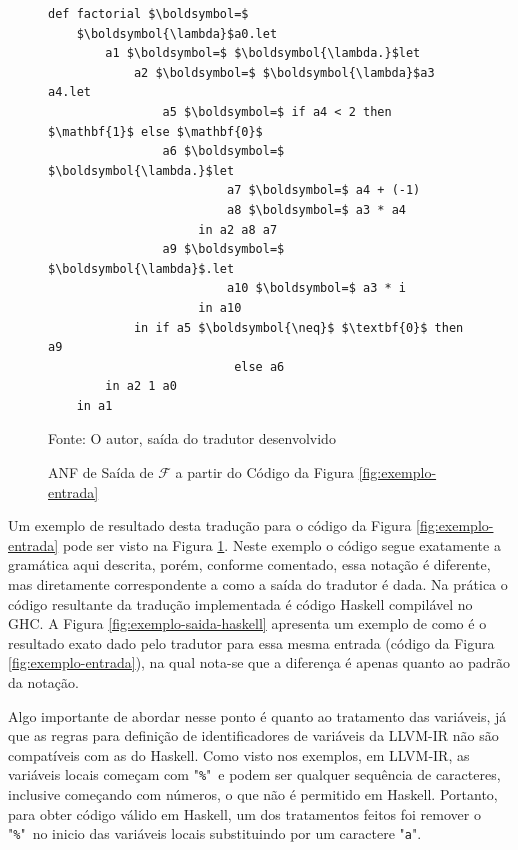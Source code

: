 \begin{figure}[h]
\begin{center}
\renewcommand{\ttdefault}{pcr}
\begin{lstlisting}[mathescape]
def factorial $\boldsymbol=$
    $\boldsymbol{\lambda}$a0.let
        a1 $\boldsymbol=$ $\boldsymbol{\lambda.}$let
            a2 $\boldsymbol=$ $\boldsymbol{\lambda}$a3 a4.let
                a5 $\boldsymbol=$ if a4 < 2 then $\mathbf{1}$ else $\mathbf{0}$
                a6 $\boldsymbol=$ $\boldsymbol{\lambda.}$let
                         a7 $\boldsymbol=$ a4 + (-1)
                         a8 $\boldsymbol=$ a3 * a4
                     in a2 a8 a7
                a9 $\boldsymbol=$ $\boldsymbol{\lambda}$.let
                         a10 $\boldsymbol=$ a3 * i
                     in a10
            in if a5 $\boldsymbol{\neq}$ $\textbf{0}$ then a9
                          else a6
        in a2 1 a0
    in a1
\end{lstlisting}
\caption{ANF de Saída de $\mathcal{F}$ a partir do Código da Figura \ref{fig:exemplo-entrada}}
\label{fig:exemplo-saida}
\small{Fonte: O autor, saída do tradutor desenvolvido}
\end{center}
\end{figure}

Um exemplo de resultado desta tradução para o código da Figura \ref{fig:exemplo-entrada} pode ser visto na Figura \ref{fig:exemplo-saida}. Neste exemplo o código segue exatamente a gramática aqui descrita, porém, conforme comentado, essa notação é diferente, mas diretamente correspondente a como a saída do tradutor é dada. Na prática o código resultante da tradução implementada é código Haskell compilável no GHC. A Figura \ref{fig:exemplo-saida-haskell} apresenta um exemplo de como é o resultado exato dado pelo tradutor para essa mesma entrada (código da Figura \ref{fig:exemplo-entrada}), na qual nota-se que a diferença é apenas quanto ao padrão da notação.

Algo importante de abordar nesse ponto é quanto ao tratamento das variáveis, já que as regras para definição de  identificadores de variáveis da LLVM-IR não são compatíveis com as do Haskell. Como visto nos exemplos, em LLVM-IR, as variáveis locais começam com "\verb|%|"\ e podem ser qualquer sequência de caracteres, inclusive começando com números, o que não é permitido em Haskell. Portanto, para obter código válido em Haskell, um dos tratamentos feitos foi remover o "\verb|%|"\ no inicio das variáveis locais substituindo por um caractere "\verb|a|".

